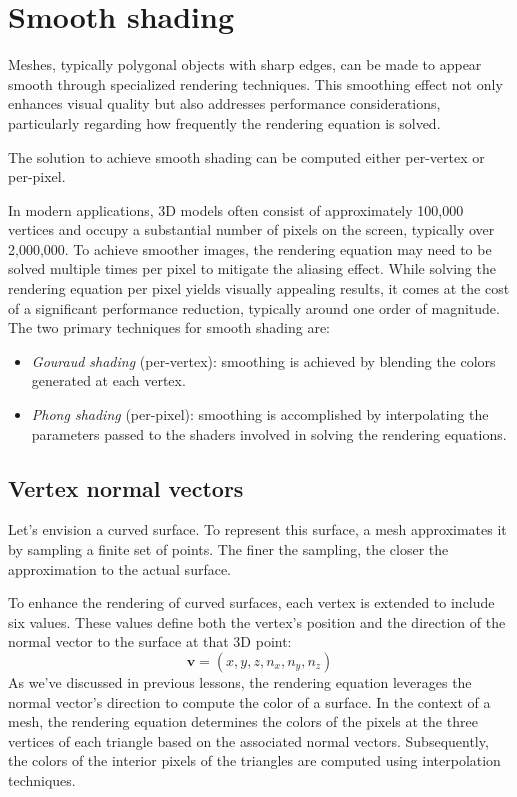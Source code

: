 \section{Smooth shading}

Meshes, typically polygonal objects with sharp edges, can be made to appear smooth through specialized rendering techniques.
This smoothing effect not only enhances visual quality but also addresses performance considerations, particularly regarding how frequently the rendering equation is solved.

The solution to achieve smooth shading can be computed either per-vertex or per-pixel.

In modern applications, 3D models often consist of approximately 100,000 vertices and occupy a substantial number of pixels on the screen, typically over 2,000,000. 
To achieve smoother images, the rendering equation may need to be solved multiple times per pixel to mitigate the aliasing effect. 
While solving the rendering equation per pixel yields visually appealing results, it comes at the cost of a significant performance reduction, typically around one order of magnitude.
The two primary techniques for smooth shading are:
\begin{itemize}
    \item \textit{Gouraud shading} (per-vertex): smoothing is achieved by blending the colors generated at each vertex.
    \item \textit{Phong shading} (per-pixel): smoothing is accomplished by interpolating the parameters passed to the shaders involved in solving the rendering equations.
\end{itemize}

\subsection{Vertex normal vectors}
Let's envision a curved surface. To represent this surface, a mesh approximates it by sampling a finite set of points. 
The finer the sampling, the closer the approximation to the actual surface.

To enhance the rendering of curved surfaces, each vertex is extended to include six values. 
These values define both the vertex's position and the direction of the normal vector to the surface at that 3D point:
\[\mathbf{v}=(x,y,z,n_x,n_y,n_z)\]
As we've discussed in previous lessons, the rendering equation leverages the normal vector's direction to compute the color of a surface.
In the context of a mesh, the rendering equation determines the colors of the pixels at the three vertices of each triangle based on the associated normal vectors. 
Subsequently, the colors of the interior pixels of the triangles are computed using interpolation techniques.


